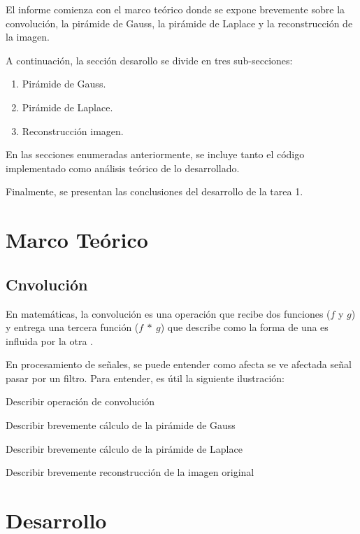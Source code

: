 \par El informe comienza con el marco teórico donde se expone brevemente sobre la convolución, la pirámide de Gauss, la pirámide de Laplace y la reconstrucción de la imagen. 

\par A continuación, la sección desarollo se divide en tres sub-secciones:
\begin{enumerate}
  \item Pirámide de Gauss.
  \item Pirámide de Laplace.
  \item Reconstrucción imagen. 
\end{enumerate}

\par En las secciones enumeradas anteriormente, se incluye tanto el código implementado como análisis teórico de lo desarrollado. 

\par Finalmente, se presentan las conclusiones del desarrollo de la tarea 1. 

\newpage
\section{Marco Teórico}
\subsection{Cnvolución}

\par En matemáticas, la convolución es una operación que recibe dos funciones ($f$ y $g$) y entrega una tercera función ($f \: \ast \: g $) que describe como la forma de una es influida por la otra \cite{WikiConv}.
\par En procesamiento de señales, se puede entender como afecta se ve afectada señal  pasar por un filtro. Para entender, es útil la siguiente ilustración: 

\par Describir operación de convolución
\par Describir brevemente cálculo de la pirámide de Gauss
\par Describir brevemente cálculo de la pirámide de Laplace
\par Describir brevemente reconstrucción de la imagen original


\newpage
\section{Desarrollo}
